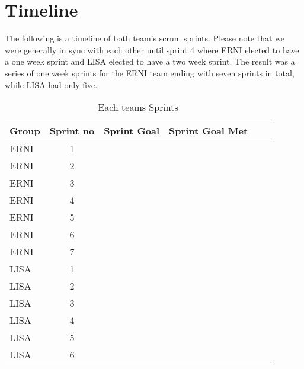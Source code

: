 \section {Timeline}

The following is a timeline of both team's scrum sprints. Please note that we were generally in sync with each other until sprint 4 where ERNI elected to have a one week sprint and LISA elected to have a two week sprint. The result was a series of one week sprints for the ERNI team ending with seven sprints in total, while LISA had only five.

\begin{table}
\centering
\begin{tabular}{|l|c|c|c|c|c}
\hline
Group & Sprint no & Sprint Goal & Sprint Goal Met \\ \hline\hline
ERNI & 1 \\
ERNI & 2 \\
ERNI & 3 \\
ERNI & 4 \\
ERNI & 5 \\
ERNI & 6 \\
ERNI & 7 \\
LISA & 1 \\
LISA & 2 \\
LISA & 3 \\
LISA & 4 \\
LISA & 5 \\
LISA & 6 \\
\hline
\end{tabular}
\caption{Each teams Sprints}\label{fig:timeline}
\end{table}